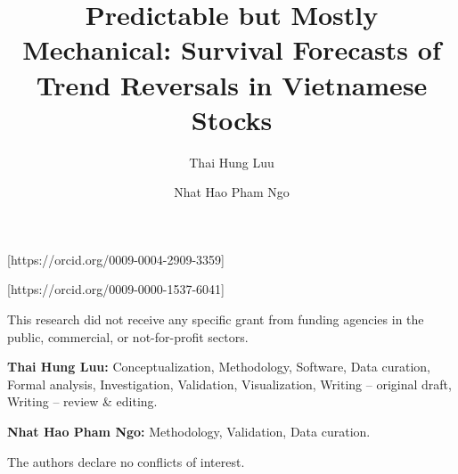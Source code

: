 \documentclass[APA]{USG}
\begin{document}
\title{Predictable but Mostly Mechanical: Survival Forecasts of Trend Reversals in Vietnamese
Stocks}
\author[1]{Thai Hung Luu}[https://orcid.org/0009-0004-2909-3359]
\author[2]{Nhat Hao Pham Ngo}[https://orcid.org/0009-0000-1537-6041]
\address[1]{}
\address[2]{}
\abstract[ABSTRACT]{}

\maketitle
\linenumbers










This research did not receive any specific grant from funding agencies in the public, commercial,
or not-for-profit sectors.

\textbf{Thai Hung Luu:} Conceptualization, Methodology, Software, Data curation, Formal analysis,
Investigation, Validation, Visualization, Writing -- original draft, Writing -- review \& editing.\par
\noindent\textbf{Nhat Hao Pham Ngo:} Methodology, Validation, Data curation.

The authors declare no conflicts of interest.
\end{document}
